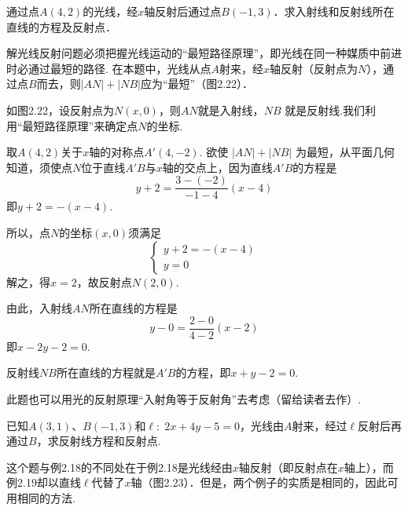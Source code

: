 \begin{example}
    通过点$A(4,2)$的光线，经$x$轴反射后通过点$B(-1,3)$．求入射线和反射线所在直线的方程及反射点．
\end{example}

\begin{analyze}
 解光线反射问题必须把握光线运动的“最短路径原理”，即光线在同一种媒质中前进时必通过最短的路径. 在本题中，光线从点$A$射来，经$x$轴反射（反射点为$N$），通过点$B$而去，则$|AN|+|NB|$应为“最短”（图2.22）．
\end{analyze}

\begin{solution}
    如图2.22，设反射点为$N(x,0)$，则$AN$就是入射线，$NB$
就是反射线.我们利用“最短路径原理”来确定点$N$的坐标.

取$A(4,2)$关于$x$轴的对称点$A'(4,-2)$. 欲使
$|AN|+|NB|$
为最短，从平面几何知道，须使点$N$位于直线$A'B$与$x$轴的交点上，因为直线$A'B$的方程是
\[y+2=\frac{3-(-2)}{-1-4}(x-4)\]
即$y+2=-(x-4)$.

所以，点$N$的坐标$(x,0)$须满足
\[\begin{cases}
    y+2=-(x-4)\\
    y=0   
\end{cases}\]
解之，得$x=2$，故反射点$N(2,0)$.

由此，入射线$AN$所在直线的方程是
\[y-0=\frac{2-0}{4-2}(x-2)\]
即$x-2y-2=0$.

反射线$NB$所在直线的方程就是$A'B$的方程，即$x+y-2=0$.
\end{solution}

\begin{rmk}
此题也可以用光的反射原理“入射角等于反射角”去考虑（留给读者去作）.
\end{rmk}

\begin{example}
     已知$A(3,1)$、$B(-1,3)$和$\ell:\; 2x+4y-5=0$，光线由$A$射来，经过$\ell$反射后再通过$B$，求反射线方程和反射点.
\end{example}

\begin{analyze}
    这个题与例2.18的不同处在于例2.18是光线经由$x$轴反射（即反射点在$x$轴上），而例2.19却以直线$\ell$代替了$x$轴（图2.23）．但是，两个例子的实质是相同的，因此可用相同的方法.
\end{analyze}

